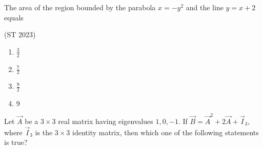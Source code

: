 \item The area of the region bounded by the parabola $x = -y^2$ and the line $y = x + 2$ equals 

	\hfill(ST 2023) 
	\begin{multicols}{4}
\begin{enumerate}
    \item $\frac{3}{2}$
    \item $\frac{7}{2}$
    \item $\frac{9}{2}$
    \item $9$
\end{enumerate}
\end{multicols}
\item Let $\vec{A}$ be a $3 \times 3$ real matrix having eigenvalues $1, 0, -1$. If $\vec{B} = \vec{A}^2 + 2\vec{A} + \vec{I}_3$, where $\vec{I}_3$ is the $3\times 3$ identity matrix, then which one of the following statements is true? 

